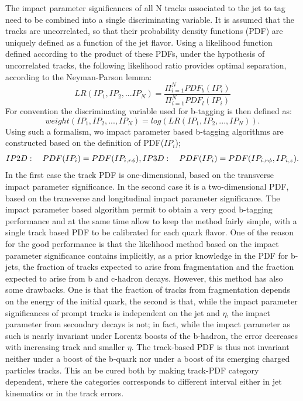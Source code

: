 The impact parameter significances of all N tracks associated to the jet to tag need to be combined into a single discriminating variable. It is assumed that the tracks are uncorrelated, so that their probability density functions (PDF) are uniquely defined as a function of the jet flavor. Using a likelihood function defined according to the product of these PDFs, under the hypothesis of uncorrelated tracks, the following likelihood ratio provides optimal separation, according to the Neyman-Parson lemma:
\begin{equation}
LR(IP_1,IP_2,...IP_N) = \frac{\Pi_{i=1}^N PDF_b(IP_i)}{\Pi_{i=1}^N PDF_l(IP_i)}
\end{equation}
For convention the discriminating variable used for b-tagging is then defined as:
\begin{equation}
weight(IP_1,IP_2,... , IP_N) = log(LR(IP_1,IP_2,...,IP_N)).
\end{equation}
Using such a formalism, wo impact parameter based b-tagging algorithms are constructed based on the definition of PDF($IP_i$);
\begin{equation}
IP2D:\quad PDF(IP_i) = PDF(IP_{i,r\phi}),\\
IP3D:\quad PDF(IP_i) = PDF(IP_{i,r\phi},IP_{i,z}).
\end{equation}
In the first case the track PDF is one-dimensional, based on the transverse impact parameter significance. In the second case it is a two-dimensional PDF, based on the transverse and longitudinal impact parameter significance.
The impact parameter based algorithm permit to obtain a very good b-tagging performance and at the same time allow to keep the method fairly simple, with a single track based PDF to be calibrated for each quark flavor.
One of the reason for the good performance is that the likelihood method based on the impact parameter significance contains implicitly, as a prior knowledge in the PDF for b-jets, the fraction of tracks expected to arise from fragmentation and the fraction expected to arise from b and c-hadron decays. However, this method has also some drawbacks. One is that the fraction of tracks from fragmentation depends on the energy of the initial quark, the second is that, while the impact parameter significances of prompt tracks is independent on the jet \pt and $\eta$, the impact parameter from secondary decays is not; in fact, while the impact parameter as such is nearly invariant under Lorentz boosts of the b-hadron, the error decreases with increasing track \pt and smaller $\eta$. The track-based PDF is thus not invariant neither under a boost of the b-quark nor under a boost of its emerging charged particles tracks. This an be cured both by making track-PDF category dependent, where the categories corresponds to different interval either in jet kinematics or in the track errors.
